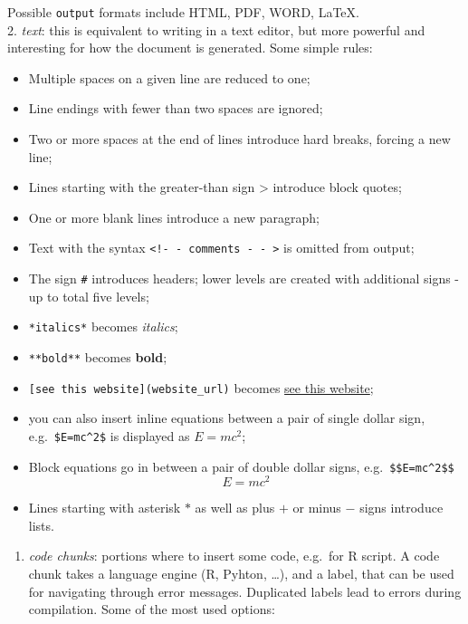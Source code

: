 \documentclass[
]{article}
\providecommand{\tightlist}{%
  \setlength{\itemsep}{0pt}\setlength{\parskip}{0pt}}
\begin{document}
Possible \texttt{output} formats include HTML, PDF, WORD, LaTeX.\\
2. \emph{text}: this is equivalent to writing in a text editor, but more
powerful and interesting for how the document is generated. Some simple
rules:

\begin{itemize}
\tightlist
\item
  Multiple spaces on a given line are reduced to one;
\item
  Line endings with fewer than two spaces are ignored;
\item
  Two or more spaces at the end of lines introduce hard breaks, forcing
  a new line;
\item
  Lines starting with the greater-than sign \textgreater{} introduce
  block quotes;
\item
  One or more blank lines introduce a new paragraph;
\item
  Text with the syntax
  \texttt{\textless{}!-\ -\ comments\ -\ -\ \textgreater{}} is omitted
  from output;
\item
  The sign \texttt{\#} introduces headers; lower levels are created with
  additional signs - up to total five levels;
\item
  \texttt{*italics*} becomes \emph{italics};
\item
  \texttt{**bold**} becomes \textbf{bold};
\item
  \texttt{{[}see\ this\ website{]}(website\_url)} becomes
  \href{website_url}{see this website};
\item
  you can also insert inline equations between a pair of single dollar
  sign, e.g.~\texttt{\$E=mc\^{}2\$} is displayed as \(E=mc^2\);
\item
  Block equations go in between a pair of double dollar signs,
  e.g.~\texttt{\$\$E=mc\^{}2\$\$} \[E=mc^2\]
\item
  Lines starting with asterisk \(*\) as well as plus \(+\) or minus
  \(-\) signs introduce lists.
\end{itemize}

\begin{enumerate}
\def\labelenumi{\arabic{enumi}.}
\setcounter{enumi}{2}
\tightlist
\item
  \emph{code chunks}: portions where to insert some code, e.g.~for R
  script. A code chunk takes a language engine (R, Pyhton, \ldots), and
  a label, that can be used for navigating through error messages.
  Duplicated labels lead to errors during compilation. Some of the most
  used options:
\end{enumerate}
\end{document}
